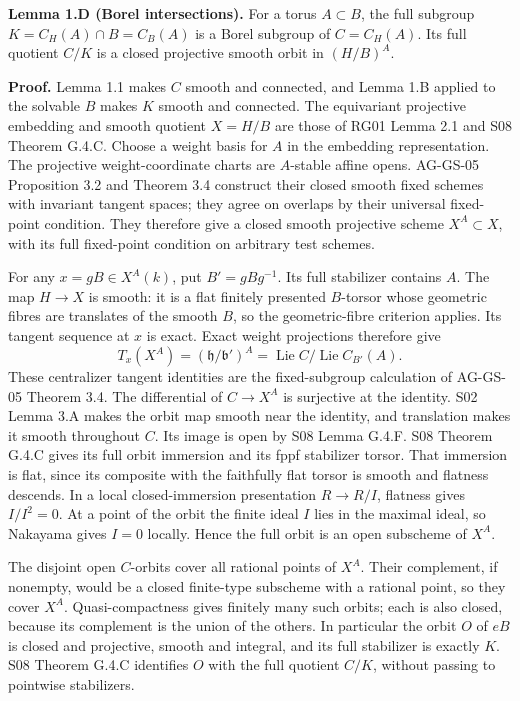 \documentclass[11pt,a4paper,openany]{report}
\newcounter{none}
\begin{document}
\textbf{Lemma 1.D (Borel intersections).} For a torus \(A\subset B\), the full subgroup \(K=C_H(A)\cap B=C_B(A)\) is a Borel subgroup of \(C=C_H(A)\). Its full quotient \(C/K\) is a closed projective smooth orbit in \((H/B)^A\).

\textbf{Proof.} Lemma 1.1 makes \(C\) smooth and connected, and Lemma 1.B applied to the solvable \(B\) makes \(K\) smooth and connected. The equivariant projective embedding and smooth quotient \(X=H/B\) are those of RG01 Lemma 2.1 and S08 Theorem G.4.C. Choose a weight basis for \(A\) in the embedding representation. The projective weight-coordinate charts are \(A\)-stable affine opens. AG-GS-05 Proposition 3.2 and Theorem 3.4 construct their closed smooth fixed schemes with invariant tangent spaces; they agree on overlaps by their universal fixed-point condition. They therefore give a closed smooth projective scheme \(X^A\subset X\), with its full fixed-point condition on arbitrary test schemes.

For any \(x=gB\in X^A(k)\), put \(B'=gBg^{-1}\). Its full stabilizer contains \(A\). The map \(H\to X\) is smooth: it is a flat finitely presented \(B\)-torsor whose geometric fibres are translates of the smooth \(B\), so the geometric-fibre criterion applies. Its tangent sequence at \(x\) is exact. Exact weight projections therefore give \[
 T_x(X^A)=(\mathfrak h/\mathfrak b')^A
       =\operatorname{Lie}C/\operatorname{Lie}C_{B'}(A).
\] These centralizer tangent identities are the fixed-subgroup calculation of AG-GS-05 Theorem 3.4. The differential of \(C\to X^A\) is surjective at the identity. S02 Lemma 3.A makes the orbit map smooth near the identity, and translation makes it smooth throughout \(C\). Its image is open by S08 Lemma G.4.F. S08 Theorem G.4.C gives its full orbit immersion and its fppf stabilizer torsor. That immersion is flat, since its composite with the faithfully flat torsor is smooth and flatness descends. In a local closed-immersion presentation \(R\to R/I\), flatness gives \(I/I^2=0\). At a point of the orbit the finite ideal \(I\) lies in the maximal ideal, so Nakayama gives \(I=0\) locally. Hence the full orbit is an open subscheme of \(X^A\).

The disjoint open \(C\)-orbits cover all rational points of \(X^A\). Their complement, if nonempty, would be a closed finite-type subscheme with a rational point, so they cover \(X^A\). Quasi-compactness gives finitely many such orbits; each is also closed, because its complement is the union of the others. In particular the orbit \(O\) of \(eB\) is closed and projective, smooth and integral, and its full stabilizer is exactly \(K\). S08 Theorem G.4.C identifies \(O\) with the full quotient \(C/K\), without passing to pointwise stabilizers.
\end{document}
